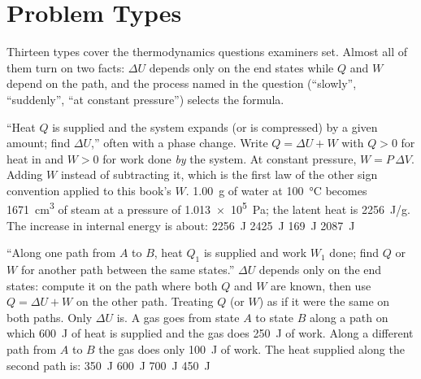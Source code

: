 \section{Problem Types}\label{sec:types-thermo}

Thirteen types cover the thermodynamics questions examiners set. Almost all of them turn on two facts:
$\Delta U$ depends only on the end states while $Q$ and $W$ depend on the path, and the process named in
the question (``slowly'', ``suddenly'', ``at constant pressure'') selects the formula.

{``Heat $Q$ is supplied and the system expands (or is compressed) by a given amount; find $\Delta U$,'' often
with a phase change.}
{Write $Q=\Delta U+W$ with $Q>0$ for heat in and $W>0$ for work done \emph{by} the system. At constant
pressure, $W=P\,\Delta V$.}
{Adding $W$ instead of subtracting it, which is the first law of the other sign convention applied to this
book's $W$.}
{\SI{1.00}{g} of water at \SI{100}{\celsius} becomes \SI{1671}{cm^3} of steam at a pressure of
\SI{1.013e5}{Pa}; the latent heat is \SI{2256}{J/g}. The increase in internal energy is about:}
{\SI{2256}{J}}
{\SI{2425}{J}}
{\SI{169}{J}}
{\SI{2087}{J}}

{``Along one path from $A$ to $B$, heat $Q_1$ is supplied and work $W_1$ done; find $Q$ or $W$ for another path
between the same states.''}
{$\Delta U$ depends only on the end states: compute it on the path where both $Q$ and $W$ are known, then use
$Q=\Delta U+W$ on the other path.}
{Treating $Q$ (or $W$) as if it were the same on both paths. Only $\Delta U$ is.}
{A gas goes from state $A$ to state $B$ along a path on which \SI{600}{J} of heat is supplied and the gas does
\SI{250}{J} of work. Along a different path from $A$ to $B$ the gas does only \SI{100}{J} of work. The heat
supplied along the second path is:}
{\SI{350}{J}}
{\SI{600}{J}}
{\SI{700}{J}}
{\SI{450}{J}}

